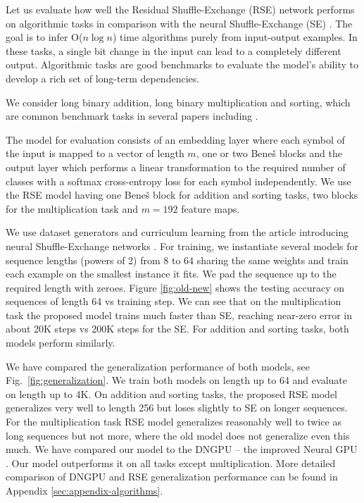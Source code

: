 \documentclass[letterpaper]{article} %
\begin{document}
Let us evaluate how well the Residual Shuffle-Exchange (RSE) network performs on algorithmic tasks in comparison with the neural Shuffle-Exchange (SE) \citep{shuffle-exchange}. The goal is to infer O($n \log n$) time algorithms purely from input-output examples. In these tasks, a single bit change in the input can lead to a completely different output. Algorithmic tasks are good benchmarks to evaluate the model's ability to develop a rich set of long-term dependencies.

We consider long binary addition, long binary multiplication and sorting, which are common benchmark tasks in several papers including \citep{shuffle-exchange, kalchbrenner2015grid, zaremba2015reinforcement,zaremba2016learning,joulin2015inferring, grefenstette2015learning, Kaiser2015NeuralGPU, freivalds2017improving, dehghani2018universal}. 

The model for evaluation consists of an embedding layer where each symbol of the input is mapped to a vector of length $m$, one or two Bene\v{s} blocks and the output layer which performs a linear transformation to the required number of classes with a softmax cross-entropy loss for each symbol independently. We use the RSE model having one Bene\v{s} block for addition and sorting tasks, two blocks for the multiplication task and $m=192$ feature maps. 

We use dataset generators and curriculum learning from the article introducing neural Shuffle-Exchange networks \citep{shuffle-exchange}. For training, we instantiate several models for sequence lengths (powers of 2) from 8 to 64 sharing the same weights and train each example on the smallest instance it fits. We pad the sequence up to the required length with zeroes.
Figure \ref{fig:old-new} shows the testing accuracy on sequences of length 64 vs training step. We can see that on the multiplication task the proposed model trains much faster than SE, reaching near-zero error in about 20K steps vs 200K steps for the SE. For addition and sorting tasks, both models perform similarly.

We have compared the generalization performance of both models, see Fig.~\ref{fig:generalization}. We train both models on length up to 64 and evaluate on length up to 4K. On addition and sorting tasks, the proposed RSE model generalizes very well to length 256 but loses slightly to SE on longer sequences. For the multiplication task RSE model generalizes reasonably well to twice as long sequences but not more, where the old model does not generalize even this much. We have compared our model to the DNGPU -- the improved Neural GPU \citep{freivalds2017improving}. Our model outperforms it on all tasks except multiplication. More detailed comparison of DNGPU and RSE generalization performance can be found in Appendix \ref{sec:appendix-algorithms}.
\end{document}
